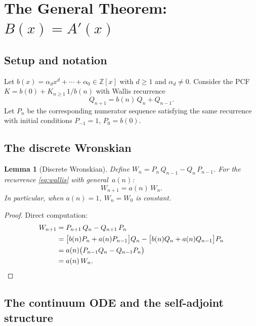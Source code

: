 \documentclass[11pt,a4paper]{amsart}
\theoremstyle{plain}
\newtheorem{lemma}[theorem]{Lemma}
\theoremstyle{definition}
\theoremstyle{remark}
\newcommand{\Z}{\mathbb{Z}}
\begin{document}
\section{The General Theorem: \texorpdfstring{$B(x)=A'(x)$}{B(x)=A'(x)}}
\label{sec:general}

\subsection{Setup and notation}

Let $b(x) = \alpha_d x^d + \cdots + \alpha_0 \in \Z[x]$ with
$d\ge 1$ and $\alpha_d\ne 0$.  Consider the PCF
$K = b(0) + K_{n\ge 1}\,1/b(n)$ with Wallis recurrence
\begin{equation}\label{eq:wallis-unit}
  Q_{n+1} = b(n)\,Q_n + Q_{n-1}.
\end{equation}
Let $P_n$ be the corresponding numerator sequence satisfying the
same recurrence with initial conditions $P_{-1}=1$, $P_0=b(0)$.

\subsection{The discrete Wronskian}

\begin{lemma}[Discrete Wronskian]\label{lem:wronskian}
Define $W_n = P_n\,Q_{n-1} - Q_n\,P_{n-1}$.  For the recurrence
\eqref{eq:wallis} with general~$a(n)$:
\[
  W_{n+1} = a(n)\,W_n.
\]
In particular, when $a(n)=1$, $W_n = W_0$ is constant.
\end{lemma}

\begin{proof}
Direct computation:
\begin{align*}
  W_{n+1} &= P_{n+1}\,Q_n - Q_{n+1}\,P_n \\
  &= \bigl[b(n)P_n + a(n)P_{n-1}\bigr]Q_n
   - \bigl[b(n)Q_n + a(n)Q_{n-1}\bigr]P_n \\
  &= a(n)\bigl(P_{n-1}Q_n - Q_{n-1}P_n\bigr) \\
  &= a(n)\,W_n. \qedhere
\end{align*}
\end{proof}

\subsection{The continuum ODE and the self-adjoint structure}
\end{document}
